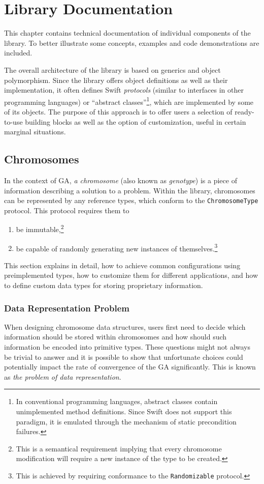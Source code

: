 \chapter{Library Documentation}
This chapter contains technical documentation of individual components of the library. To better illustrate some concepts, examples and code demonstrations are included.

The overall architecture of the library is based on generics and object polymorphism. Since the library offers object definitions as well as their implementation, it often defines Swift \textit{protocols} (similar to interfaces in other programming languages) or ``abstract classes''\footnote{In conventional programming languages, abstract classes contain unimplemented method definitions. Since Swift does not support this paradigm, it is emulated through the mechanism of static precondition failures.}, which are implemented by some of its objects. The purpose of this approach is to offer users a selection of ready-to-use building blocks as well as the option of customization, useful in certain marginal situations.

\section{Chromosomes}
In the context of GA, \textit{a chromosome} (also known as \textit{genotype}) is a piece of information describing a solution to a problem. \cite{GaPracticalHandbook} Within the library, chromosomes can be represented by any reference types, which conform to the \texttt{ChromosomeType} protocol. This protocol requires them to
~
\begin{enumerate}
	\item be immutable,\footnote{This is a semantical requirement implying that every chromosome modification will require a new instance of the type to be created.}
	\item be capable of randomly generating new instances of themselves.\footnote{This is achieved by requiring conformance to the \texttt{Randomizable} protocol.}
\end{enumerate}

This section explains in detail, how to achieve common configurations using preimplemented types, how to customize them for different applications, and how to define custom data types for storing proprietary information.

\subsection{Data Representation Problem}
When designing chromosome data structures, users first need to decide which information should be stored within chromosomes and how should such information be encoded into primitive types. These questions might not always be trivial to answer and it is possible to show that 
unfortunate choices could potentially impact the rate of convergence of the GA significantly. This is known as \textit{the problem of data representation}.

